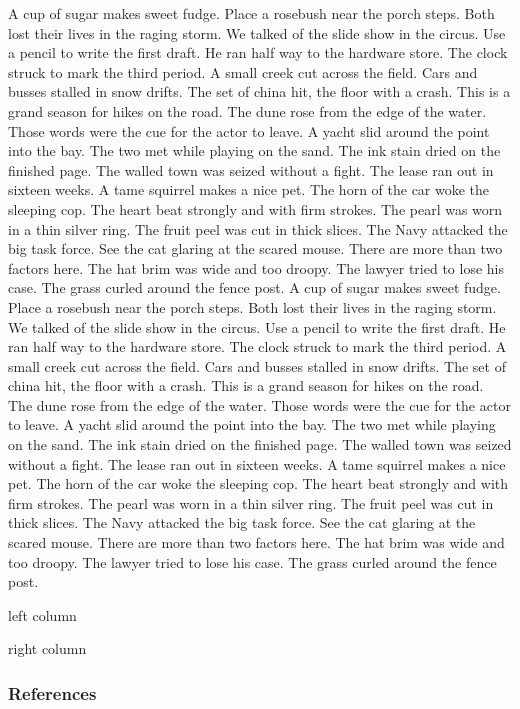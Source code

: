 \documentclass[
  letterpaper,
  DIV=11,
  numbers=noendperiod]{scrartcl}
\begin{document}
A cup of sugar makes sweet fudge. Place a rosebush near the porch steps.
Both lost their lives in the raging storm. We talked of the slide show
in the circus. Use a pencil to write the first draft. He ran half way to
the hardware store. The clock struck to mark the third period. A small
creek cut across the field. Cars and busses stalled in snow drifts. The
set of china hit, the floor with a crash. This is a grand season for
hikes on the road. The dune rose from the edge of the water. Those words
were the cue for the actor to leave. A yacht slid around the point into
the bay. The two met while playing on the sand. The ink stain dried on
the finished page. The walled town was seized without a fight. The lease
ran out in sixteen weeks. A tame squirrel makes a nice pet. The horn of
the car woke the sleeping cop. The heart beat strongly and with firm
strokes. The pearl was worn in a thin silver ring. The fruit peel was
cut in thick slices. The Navy attacked the big task force. See the cat
glaring at the scared mouse. There are more than two factors here. The
hat brim was wide and too droopy. The lawyer tried to lose his case. The
grass curled around the fence post. A cup of sugar makes sweet fudge.
Place a rosebush near the porch steps. Both lost their lives in the
raging storm. We talked of the slide show in the circus. Use a pencil to
write the first draft. He ran half way to the hardware store. The clock
struck to mark the third period. A small creek cut across the field.
Cars and busses stalled in snow drifts. The set of china hit, the floor
with a crash. This is a grand season for hikes on the road. The dune
rose from the edge of the water. Those words were the cue for the actor
to leave. A yacht slid around the point into the bay. The two met while
playing on the sand. The ink stain dried on the finished page. The
walled town was seized without a fight. The lease ran out in sixteen
weeks. A tame squirrel makes a nice pet. The horn of the car woke the
sleeping cop. The heart beat strongly and with firm strokes. The pearl
was worn in a thin silver ring. The fruit peel was cut in thick slices.
The Navy attacked the big task force. See the cat glaring at the scared
mouse. There are more than two factors here. The hat brim was wide and
too droopy. The lawyer tried to lose his case. The grass curled around
the fence post.

left column

right column

\hypertarget{references}{%
\subsubsection{References}\label{references}}
\end{document}
